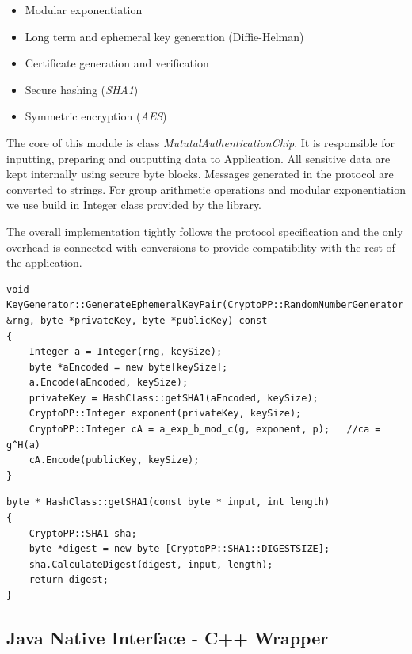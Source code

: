 \documentclass[11pt,titlepage]{article}
\theoremstyle{plain}
\begin{document}
\begin{itemize}
\item Modular exponentiation
\item Long term and ephemeral key generation (Diffie-Helman)
\item Certificate generation and verification
\item Secure hashing (\textit{SHA1})
\item Symmetric encryption (\textit{AES})
\end{itemize}

The core of this module is class \textit{MututalAuthenticationChip}. It is responsible for inputting, preparing and outputting data to Application. All sensitive data are kept internally using secure byte blocks. Messages generated in the protocol are converted to strings.
For group arithmetic operations and modular exponentiation we use build in Integer class provided by the library. 

\vspace{5mm}

The overall implementation tightly follows the protocol specification and the only overhead is connected with conversions to provide compatibility with the rest of the application.
\begin{lstlisting}
void KeyGenerator::GenerateEphemeralKeyPair(CryptoPP::RandomNumberGenerator &rng, byte *privateKey, byte *publicKey) const
{
    Integer a = Integer(rng, keySize);
    byte *aEncoded = new byte[keySize];
    a.Encode(aEncoded, keySize);
    privateKey = HashClass::getSHA1(aEncoded, keySize);
    CryptoPP::Integer exponent(privateKey, keySize);
    CryptoPP::Integer cA = a_exp_b_mod_c(g, exponent, p);   //ca = g^H(a)
    cA.Encode(publicKey, keySize);
}
\end{lstlisting}

\begin{lstlisting}
byte * HashClass::getSHA1(const byte * input, int length)
{
	CryptoPP::SHA1 sha;
	byte *digest = new byte [CryptoPP::SHA1::DIGESTSIZE];
	sha.CalculateDigest(digest, input, length);
	return digest;
}
\end{lstlisting}

\subsection{Java Native Interface - C++ Wrapper}
\end{document}
